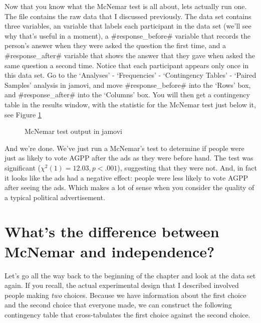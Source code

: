 
Now that you know what the McNemar test is all about, lets actually run one. The  file contains the raw data that I discussed previously. The  data set contains three variables, an  variable that labels each participant in the data set (we'll see why that's useful in a moment), a \rtextverb#response_before# variable that records the person's answer when they were asked the question the first time, and a \rtextverb#response_after# variable that shows the answer that they gave when asked the same question a second time. Notice that each participant appears only once in this data set. Go to the `Analyses' - `Frequencies' - `Contingency Tables' - `Paired Samples' analysis in jamovi, and move \rtextverb#response_before# into the `Rows' box, and \rtextverb#response_after# into the `Columns' box. You will then get a contingency table in the results window, with the statistic for the McNemar test just below it, see Figure \ref{fig:McNemar}

\begin{figure}[htb]
\begin{center}
\caption{McNemar test output in jamovi}
\label{fig:McNemar}
\HR
\end{center}
\end{figure}

And we're done. We've just run a McNemar's test to determine if people were just as likely to vote AGPP after the ads as they were before hand. The test was significant ($\chi^2(1) = 12.03, p<.001$), suggesting that they were not. And, in fact it looks like the ads had a negative effect: people were less likely to vote AGPP after seeing the ads. Which makes a lot of sense when you consider the quality of a typical political advertisement.


\section{What's the difference between McNemar and independence?}

Let's go all the way back to the beginning of the chapter and look at the  data set again. If you recall, the actual experimental design that I described involved people making {\it two} choices. Because we have information about the first choice and the second choice that everyone made, we can construct the following contingency table that cross-tabulates the first choice against the second choice.

